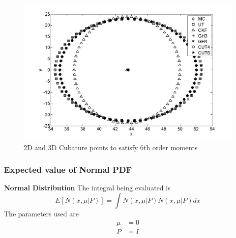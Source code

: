 \documentclass{beamer}
\begin{document}
\begin{frame}   
   \begin{figure}[thpb]
      \centering
      \includegraphics[width=1\textwidth]{polartocart}
      \caption{2D and 3D Cubature points to satisfy 6th order moments}
      \label{fig:23d4m1}
   \end{figure} 
\end{frame}
\begin{frame}
\frametitle{Expected value of Normal PDF}
{\bf Normal Distribution}
The integral being evaluated is 
\begin{equation*}
E[N(x,\mu|P)]=\int{N(x,\mu|P)N(x,\mu|P)}dx
\end{equation*}
The parameters used are
\begin{align*}
\mu&=0\\
P&=I
\end{align*}
\end{frame}
\end{document}
